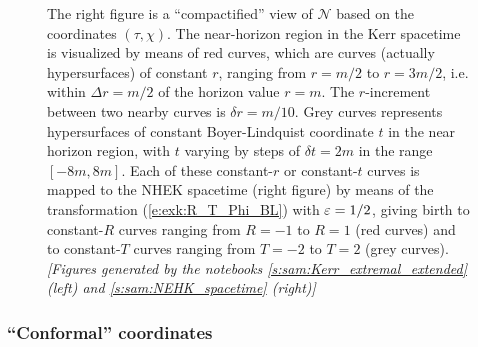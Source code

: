 \begin{figure}
{The right figure is a ``compactified'' view of $\mathscr{N}$
based on the coordinates $(\tau,\chi)$. The near-horizon region in
the Kerr spacetime is visualized by means of red curves, which
are curves (actually hypersurfaces) of constant $r$,
ranging from $r=m/2$ to $r=3m/2$, i.e. within $\Delta r = m/2$ of the horizon value $r=m$.
The $r$-increment between two nearby curves is $\delta r = m/10$.
Grey curves represents hypersurfaces of constant Boyer-Lindquist coordinate $t$
in the near horizon region, with $t$ varying by steps of $\delta t = 2m$
in the range $[-8m, 8m]$. Each of these constant-$r$ or constant-$t$ curves is mapped
to the NHEK spacetime (right figure) by means of the transformation
(\ref{e:exk:R_T_Phi_BL}) with $\varepsilon=1/2$, giving birth to constant-$R$
curves ranging from $R=-1$ to $R=1$ (red curves) and to constant-$T$
curves ranging from $T=-2$ to $T=2$ (grey curves).
\textsl{[Figures generated by the notebooks \ref{s:sam:Kerr_extremal_extended} (left)
and \ref{s:sam:NEHK_spacetime} (right)]}
}
\end{figure}



\subsubsection{``Conformal'' coordinates}

